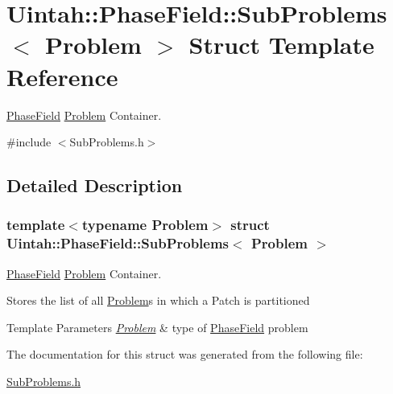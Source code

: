 \hypertarget{structUintah_1_1PhaseField_1_1SubProblems}{}\section{Uintah\+:\+:Phase\+Field\+:\+:Sub\+Problems$<$ Problem $>$ Struct Template Reference}
\label{structUintah_1_1PhaseField_1_1SubProblems}


\hyperlink{namespaceUintah_1_1PhaseField}{Phase\+Field} \hyperlink{classUintah_1_1PhaseField_1_1Problem}{Problem} Container.  




{\ttfamily \#include $<$Sub\+Problems.\+h$>$}



\subsection{Detailed Description}
\subsubsection*{template$<$typename Problem$>$\newline
struct Uintah\+::\+Phase\+Field\+::\+Sub\+Problems$<$ Problem $>$}

\hyperlink{namespaceUintah_1_1PhaseField}{Phase\+Field} \hyperlink{classUintah_1_1PhaseField_1_1Problem}{Problem} Container. 

Stores the list of all \hyperlink{classUintah_1_1PhaseField_1_1Problem}{Problem}\textquotesingle{}s in which a Patch is partitioned


\begin{DoxyTemplParams}{Template Parameters}
{\em \hyperlink{classUintah_1_1PhaseField_1_1Problem}{Problem}} & type of \hyperlink{namespaceUintah_1_1PhaseField}{Phase\+Field} problem \\
\hline
\end{DoxyTemplParams}


The documentation for this struct was generated from the following file\+:\begin{DoxyCompactItemize}
\item 
\hyperlink{SubProblems_8h}{Sub\+Problems.\+h}\end{DoxyCompactItemize}
